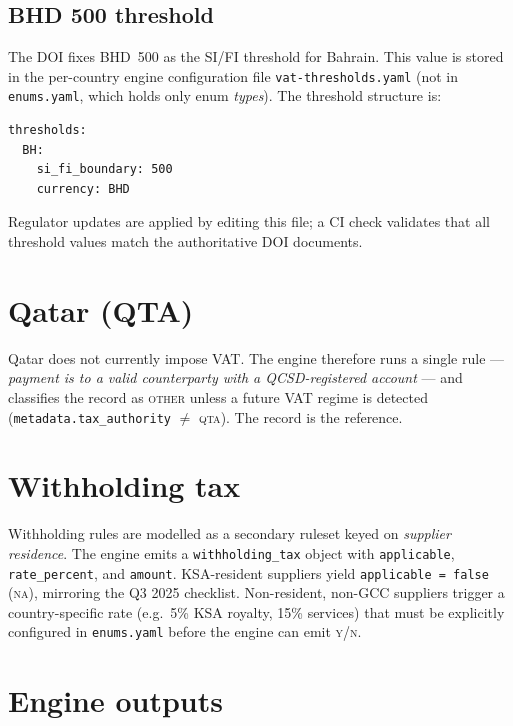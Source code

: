 \subsection{BHD 500 threshold}

The DOI fixes BHD~500 as the SI/FI threshold for Bahrain. This value is
stored in the per-country engine configuration file
\texttt{vat-thresholds.yaml} (not in \texttt{enums.yaml}, which holds
only enum \emph{types}). The threshold structure is:

\begin{lstlisting}[basicstyle=\ttfamily\small]
thresholds:
  BH:
    si_fi_boundary: 500
    currency: BHD
\end{lstlisting}

Regulator updates are applied by editing this file; a CI check validates
that all threshold values match the authoritative DOI documents.

\section{Qatar (QTA)}

Qatar does not currently impose VAT. The engine therefore runs a single
rule --- \emph{payment is to a valid counterparty with a QCSD-registered
account} --- and classifies the record as \textsc{other} unless a
future VAT regime is detected (\texttt{metadata.tax\_authority}
$\neq$ \textsc{qta}). The
\corpus{}
record is the reference.

\section{Withholding tax}

Withholding rules are modelled as a secondary ruleset keyed on
\emph{supplier residence}. The engine emits a
\texttt{withholding\_tax} object with \texttt{applicable}, \texttt{rate\_percent},
and \texttt{amount}. KSA-resident suppliers yield
\texttt{applicable~=~false} (\textsc{na}), mirroring the Q3 2025
checklist. Non-resident, non-GCC suppliers trigger a country-specific
rate (e.g.\ 5\% KSA royalty, 15\% services) that must be explicitly
configured in \texttt{enums.yaml} before the engine can emit
\textsc{y}/\textsc{n}.

\section{Engine outputs}

